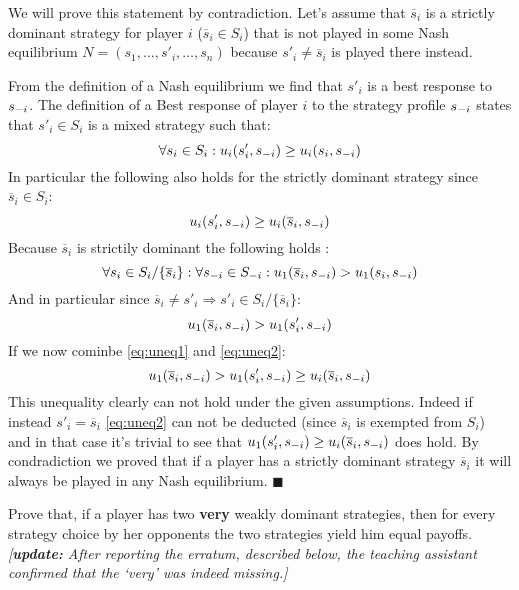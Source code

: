 \documentclass[../main.tex]{subfiles}
\begin{document}
\begin{solution}
	We will prove this statement by contradiction.
	Let's assume that $\overline{s}_i$ is a strictly dominant strategy for player $i$ ($\overline{s}_i \in S_i$) that is not played in some Nash equilibrium $N = (s_1,\ldots,s'_i,\ldots,s_n)$ because $s'_i \neq \overline{s}_i$ is played there instead.

	From the definition of a Nash equilibrium  we find that $s'_i$ is a best response to $s_{\--i}$.
	The definition of a Best response of player $i$ to the strategy profile $s_{\--i}$ states that $s'_i \in S_i$ is a mixed strategy such that:
	\begin{equation}
		\label{eq:bestr}
		\forall s_i \in S_i : u_i(s'_i,s_{\--i}) \geq u_i(s_i,s_{\--i})
	\end{equation}
	In particular the following also holds for the strictly dominant strategy since $\overline{s}_i \in S_i$:
	\begin{equation}
		\label{eq:uneq1}
		u_i(s'_i,s_{\--i}) \geq u_i(\overline{s}_i,s_{\--i})
	\end{equation}
	Because $\overline{s}_i$ is strictily dominant the following holds :
	\begin{equation}
		\forall s_i \in S_i/\{\overline{s}_i\}: \forall s_{\--i} \in S_{\--i} : u_1(\overline{s}_i,s_{\--i}) > u_1(s_i,s_{\--i})
	\end{equation}
	And in particular since $\overline{s}_i \neq s'_i \Rightarrow s'_i \in S_i/\{\overline{s}_i\}$:
	\begin{equation}
		\label{eq:uneq2}
		 u_1(\overline{s}_i,s_{\--i}) > u_1(s'_i,s_{\--i})
	\end{equation}
	If we now cominbe \autoref{eq:uneq1} and \autoref{eq:uneq2}:
	\begin{equation}
		 u_1(\overline{s}_i,s_{\--i}) > u_1(s'_i,s_{\--i}) \geq u_i(\overline{s}_i,s_{\--i})
	\end{equation}
	This unequality clearly can not hold under the given assumptions.
	Indeed if instead $s'_i = \overline{s}_i$ \autoref{eq:uneq2} can not be deducted (since $\overline{s}_i$ is exempted from $S_i$) and in that case it's trivial to see that $u_1(s'_i,s_{\--i}) \geq u_i(\overline{s}_i,s_{\--i})$ does hold.
	By condradiction we proved that if a player has a strictly dominant strategy $\overline{s}_i$ it will always be played in any Nash equilibrium. $\blacksquare$ 
\end{solution}

\begin{question}
	Prove that, if a player has two \textbf{very} weakly dominant strategies, then for every strategy choice by her opponents the two strategies yield him equal payoffs.
	\textit{[\textbf{update:} After reporting the erratum, described below, the teaching assistant confirmed that the `very' was indeed missing.]}
\end{question}
\end{document}
